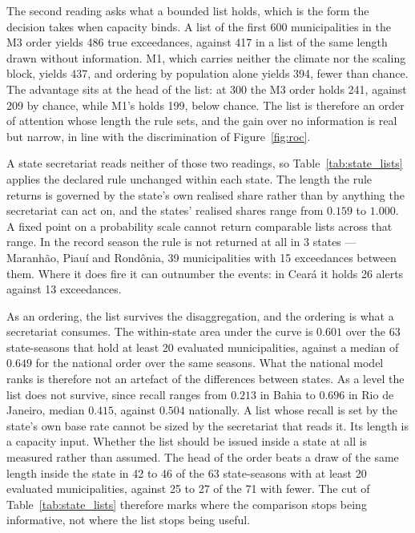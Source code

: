\documentclass[english,10pt,b5paper]{article}
\begin{document}
The second reading asks what a bounded list holds, which is the form the
decision takes when capacity binds. A list of the first 600 municipalities in
the M3 order yields 486 true exceedances, against 417 in a list of the same
length drawn without information. M1, which carries neither the climate nor
the scaling block, yields 437, and ordering by population alone yields 394,
fewer than chance. The advantage sits at the head of the list: at 300 the M3
order holds 241, against 209 by chance, while M1's holds 199, below chance.
The list is therefore an order of attention whose length the rule sets, and
the gain over no information is real but narrow, in line with the
discrimination of Figure~\ref{fig:roc}.

A state secretariat reads neither of those two readings, so
Table~\ref{tab:state_lists} applies the declared rule unchanged within each
state. The length the rule returns is governed by the state's own realised
share rather than by anything the secretariat can act on, and the states'
realised shares range from $0.159$ to $1.000$. A fixed point on a probability
scale cannot return comparable lists across that range. In the record season
the rule is not returned at all in 3 states --- Maranh\~ao, Piau\'i and
Rond\^onia, 39 municipalities with 15 exceedances between them. Where it does
fire it can outnumber the events: in Cear\'a it holds 26 alerts against 13
exceedances.

As an ordering, the list survives the disaggregation, and the ordering is what
a secretariat consumes. The within-state area under the curve is $0.601$ over
the 63 state-seasons that hold at least 20 evaluated municipalities, against a
median of $0.649$ for the national order over the same seasons. What the
national model ranks is therefore not an artefact of the differences between
states. As a level the list does not survive, since recall ranges from $0.213$
in Bahia to $0.696$ in Rio de Janeiro, median $0.415$, against $0.504$
nationally. A list whose recall is set by the state's own base rate cannot be
sized by the secretariat that reads it. Its length is a capacity input.
Whether the list should be issued inside a state at all is measured rather
than assumed. The head of the order beats a draw of the same length inside the
state in 42 to 46 of the 63 state-seasons with at least 20 evaluated
municipalities, against 25 to 27 of the 71 with fewer. The cut of
Table~\ref{tab:state_lists} therefore marks where the comparison stops being
informative, not where the list stops being useful.
\end{document}
